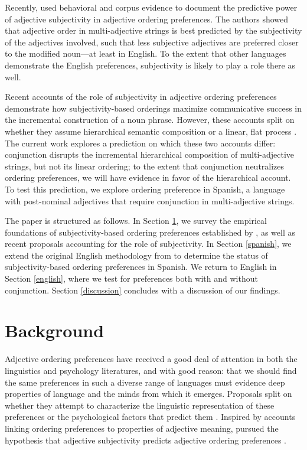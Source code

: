 \documentclass[12pt,letterpaper]{article}
\begin{document}
Recently, \cite{scontrasetal2017adjectives} used behavioral and corpus evidence to document the predictive power of adjective subjectivity in adjective ordering preferences. The authors showed that adjective order in multi-adjective strings is best predicted by the subjectivity of the adjectives involved, such that less subjective adjectives are preferred closer to the modified noun---at least in English. To the extent that other languages demonstrate the English preferences, subjectivity is likely to play a role there as well.

Recent accounts of the role of subjectivity in adjective ordering preferences demonstrate how subjectivity-based orderings maximize communicative success in the incremental construction of a noun phrase. However, these accounts split on whether they assume hierarchical semantic composition \citep{simonic2018,scontrasetalSPadjectives} or a linear, flat process \citep{hahnetal2018}. The current work explores a prediction on which these two accounts differ: conjunction disrupts the incremental hierarchical composition of multi-adjective strings, but not its linear ordering; to the extent that conjunction neutralizes ordering preferences, we will have evidence in favor of the hierarchical account. To test this prediction, we explore ordering preference in Spanish, a language with post-nominal adjectives that require conjunction in multi-adjective strings.

The paper is structured as follows. In Section \ref{background}, we survey the empirical foundations of subjectivity-based ordering preferences established by \cite{scontrasetal2017adjectives}, as well as recent proposals accounting for the role of subjectivity. In Section \ref{spanish}, we extend the original English methodology from \cite{scontrasetal2017adjectives} to determine the status of subjectivity-based ordering preferences in Spanish. We return to English in Section \ref{english}, where we test for preferences both with and without conjunction. Section \ref{discussion} concludes with a discussion of our findings.


\section{Background} \label{background}

Adjective ordering preferences have received a good deal of attention in both the linguistics and psychology literatures, and with good reason: that we should find the same preferences in such a diverse range of languages must evidence deep properties of language and the minds from which it emerges. Proposals split on whether they attempt to characterize the linguistic representation of these preferences \citep[e.g.,][]{dixon1982,cinque1994,scott2002,mcnallyboleda2004,laenzlinger2005,truswell2009} or the psychological factors that predict them \citep[e.g.,][]{Sweet1898,whorf1945,ziff1960,Martin1969competence,seiler1978}. Inspired by accounts linking ordering preferences to properties of adjective meaning, \cite{scontrasetal2017adjectives} pursued the hypothesis that adjective subjectivity predicts adjective ordering preferences \citep{quirketal1985,hetzron1978,tucker1998,hill2012}.
\end{document}
